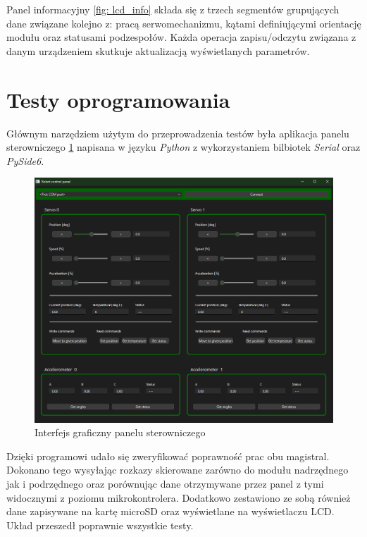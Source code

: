 Panel informacyjny \ref{fig: lcd_info} składa się z trzech segmentów grupujących dane związane kolejno z: pracą serwomechanizmu, kątami definiującymi orientację modułu oraz statusami podzespołów. Każda operacja zapisu/odczytu związana z danym urządzeniem skutkuje aktualizacją wyświetlanych parametrów.

\section{Testy oprogramowania}
Głównym narzędziem użytym do przeprowadzenia testów była aplikacja panelu sterowniczego \ref{fig: control_panel} napisana w języku \textit{Python} z wykorzystaniem bilbiotek \textit{Serial} oraz \textit{PySide6}. 

\begin{figure}[ht!]
    \centering
    \includegraphics[width=\linewidth]{rysunki/UI/control_panel.png}
    \caption{Interfejs graficzny panelu sterowniczego}
    \label{fig: control_panel}
\end{figure} 

Dzięki programowi udało się zweryfikować poprawność prac obu magistral. Dokonano tego wysyłając rozkazy skierowane zarówno do modułu nadrzędnego jak i podrzędnego oraz porównując dane otrzymywane przez panel z tymi widocznymi z poziomu mikrokontrolera. Dodatkowo zestawiono ze sobą również dane zapisywane na kartę microSD oraz wyświetlane na wyświetlaczu LCD. Układ przeszedł poprawnie wszystkie testy.

